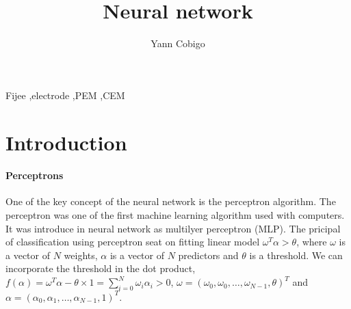 \documentclass[final, paper=letter,5p,times,twocolumn]{elsarticle}
\begin{document}
\begin{frontmatter}

\title{Neural network}

\author[label1]{Yann Cobigo}
\address[label1]{University of California, San Francisco | ucsf.edu}




\begin{abstract}
 \lipsum[11-15]
\end{abstract}

\begin{keyword}
Fijee \sep electrode \sep PEM \sep CEM
\end{keyword}

\end{frontmatter}


\section{Introduction}

\lipsum[100-104]

\paragraph{Perceptrons}{One of the key concept of the neural network is the perceptron algorithm. The perceptron was one of the first machine learning algorithm used with computers. It was introduce in neural network as multilyer perceptron (MLP). The pricipal of classification using perceptron seat on fitting linear model $\omega^{T}\alpha > \theta$, where $\omega$ is a vector of $N$ weights, $\alpha$ is a vector of $N$ predictors and $\theta$ is a threshold. We can incorporate the threshold in the dot product, $f(\alpha) = \omega^{T}\alpha - \theta \times 1 = \sum_{i=0}^{N} \omega_{i}\alpha_{i} > 0$, $\omega = (\omega_{0}, \omega_{0}, \dots, \omega_{N-1}, \theta)^{T}$ and $\alpha = (\alpha_{0}, \alpha_{1}, \dots, \alpha_{N-1}, 1)^{T}$.}
\end{document}
